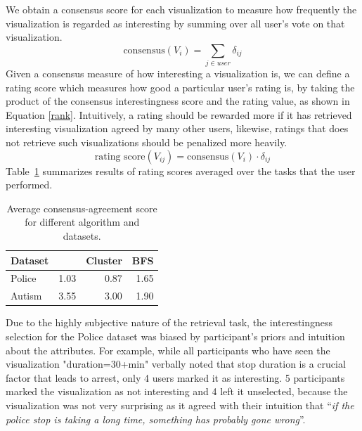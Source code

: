 We obtain a consensus score for each visualization to measure how frequently the visualization is regarded as interesting by summing over all user's vote on that visualization.
\begin{equation}\label{vote}
\textrm{consensus}(V_i) =\sum_{j\in user} \delta_{ij}
\end{equation}
Given a consensus measure of how interesting a visualization is, we can define a rating score which measures how good a particular user's rating is, by taking the product of the consensus interestingness score and the rating value, as shown in Equation \ref{rank}. Intuitively, a rating should be rewarded more if it has retrieved interesting visualization agreed by many other users, likewise, ratings that does not retrieve such visualizations should be penalized more heavily.
\begin{equation}\label{rank}
\textrm{rating score}(V_{ij}) =\textrm{consensus}(V_i) \cdot \delta_{ij}
\end{equation}
Table~\ref{table:interestingScore} summarizes results of rating scores averaged over the tasks that the user performed.
\begin{table}[ht!]
	\centering
	\begin{tabular}{lrrr}
		\hline
		 Dataset   &   \system &   Cluster &   BFS \\
		\hline
		 Police    &      1.03 &      0.87 &  1.65 \\
		 Autism    &      3.55 &      3.00 &  1.90 \\
		\hline
	\end{tabular}
	\caption{Average consensus-agreement score for different algorithm and datasets.}%
	\label{table:interestingScore}
\end{table}
\npar Due to the highly subjective nature of the retrieval task, the interestingness selection for the Police dataset was biased by participant's priors and intuition about the attributes. For example, while all participants who have seen the visualization "duration=30+min" verbally noted that stop duration is a crucial factor that leads to arrest, only 4 users marked it as interesting. 5 participants marked the visualization as not interesting and 4 left it unselected, because the visualization was not very surprising as it agreed with their intuition that ``\textit{if the police stop is taking a long time, something has probably gone wrong}''.
